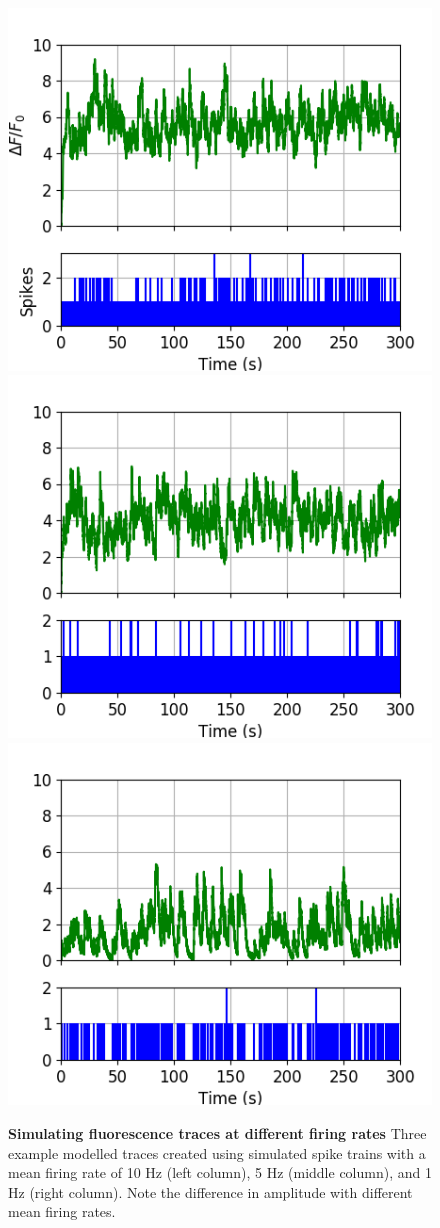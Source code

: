 \documentclass[a4paper,12pt]{article}
\theoremstyle{definition}
\begin{document}
\begin{figure}
  \includegraphics[width=0.329\linewidth]{figures/freq_compare_images_10_Hz_3_7.png}
  \includegraphics[width=0.329\linewidth]{figures/freq_compare_images_5_Hz_3_8.png}
  \includegraphics[width=0.329\linewidth]{figures/freq_compare_images_1_Hz_3_9.png}
  \caption{\textbf{Simulating fluorescence traces at different firing rates } Three example modelled traces created using simulated spike trains with a mean firing rate of 10 Hz (left column), 5 Hz (middle column), and 1 Hz (right column). Note the difference in amplitude with different mean firing rates.}
  \label{}
\end{figure}
\end{document}
